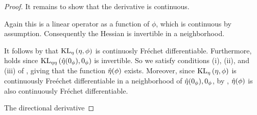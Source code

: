 \begin{thm}
\begin{proof}
It remains to show that the derivative is continuous.

%
Again this is a linear operator as a function of $\phi$, which is continuous by
assumption.  Consequently the Hessian is invertible in a neighborhood.

It follows by \citet[Proposition 4.14(c)]{zeidler:2013:functional} that
$\mathrm{KL}_{\eta}\left(\eta, \phi\right)$ is continuosly Fr{\'e}chet differentiable.  Furthermore,
\citet[Chapter 4 Condition 21b]{zeidler:2013:functional} holds since
$\mathrm{KL}_{\eta\eta}\left(\hat\eta(0_\phi), 0_\phi\right)$ is invertible.  So we satisfy conditions (i),
(ii), and (iii) of \citet[Theorem 4.B(c)]{zeidler:2013:functional}, giving that
the function $\hat\eta(\phi)$ exists.  Moreover, since $\mathrm{KL}_{\eta}\left(\eta, \phi\right)$ is
continuously Fre{\'e}chet differentiable in a neighborhood of $\hat\eta(0_\phi),
0_\phi$, by \citet[Theorem 4.B(d)]{zeidler:2013:functional}, $\hat\eta(\phi)$ is
also continuously Fr{\'e}chet differentiable.

The directional derivative

%
\end{proof}
%
\end{thm}
%
